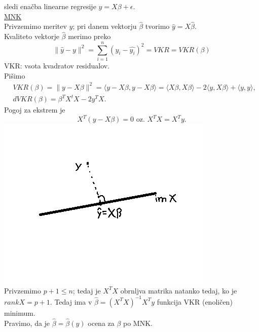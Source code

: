 \documentclass[a4paper, 12pt]{book}
\theoremstyle{definition}
\theoremstyle{remark}
\begin{document}
sledi enačba linearne regresije $y = X \beta + \epsilon$. \\
\underline{MNK} \\
Privzemimo meritev $y$;
pri danem vektorju $\hat{\beta}$ tvorimo  $\hat{y} = X \hat{\beta}$. \\
Kvaliteto vektorje $\hat{\beta}$ merimo preko
\begin{equation*}
  \lVert \hat{y} - y \rVert^2 = \sum_{i=1}^{n} (y_i - \hat{y_i})^2 = VKR = VKR(\beta)
\end{equation*}
VKR: vsota kvadratov residualov. \\
Pišimo
\begin{align*}
  &VKR(\beta) = \lVert y - X \beta \rVert^2 = \langle y - X \beta, y - X \beta\rangle
    = \langle X \beta, X \beta \rangle - 2\langle y, X \beta\rangle + \langle y, y\rangle, \\
  &dVKR(\beta) = \beta^T X^t X - 2 y^T X.
\end{align*}
Pogoj za ekstrem je
\begin{equation*}
  X^T (y - X \beta) = 0 \text{ oz. } X^T X = X^T y.
\end{equation*}
\includegraphics[scale=0.4]{projekcija_4_3} \\
Privzemimo $p+1 \leq n$; tedaj je $X^T X$ obrnljva matrika natanko tedaj,
ko je $rank X = p+1$.
Tedaj ima v $\hat{\beta} = (X^T X)^{-1} X^T y$ funkcija VKR (enoličen) minimum. \\
Pravimo, da je $\hat{\beta} = \hat{\beta}(y)$ ocena za $\beta$ po MNK.


\end{document}
